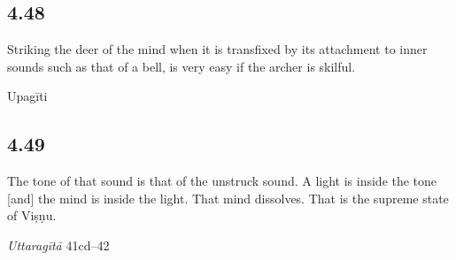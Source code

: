 \begin{ekdosis}
\begin{philcomm}[hp04_047_1]
%
\end{philcomm}



\subsection*{4.48}
\begin{translation}[hp04_048]
Striking the deer of the mind when it is transfixed by its attachment to inner sounds such as that of a bell, is very easy if the archer is skilful.
\end{translation}
%




\begin{metre}[hp04_048]
Upagīti 
\end{metre}


\subsection*{4.49}
\begin{translation}[hp04_049]
The tone of that sound is that of the unstruck sound. A light is inside the tone [and] the mind is inside the light. That mind dissolves. That is the supreme state of Viṣṇu.
\end{translation}

\begin{sources}[hp04_049]
\emph{Uttaragītā} 41cd–42 %
\begin{versinnote}
\end{versinnote}
\end{sources}


\end{ekdosis}
